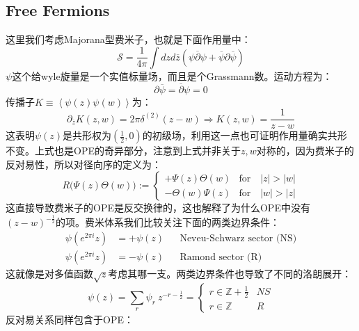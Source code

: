 \subsection{Free Fermions}
这里我们考虑Majorana型费米子，也就是下面作用量中：
\begin{equation}
	\mathcal{S}=\frac1{4\pi}\int dzd\overline{z}\left(\psi\overline{\partial}\psi+\overline{\psi}\partial\overline{\psi}\right)
\end{equation}
$\psi$这个给wyle旋量是一个实值标量场，而且是个Grassmann数。运动方程为：
\begin{equation}
	\partial\overline{\psi}=\overline{\partial}\psi=0
\end{equation}
传播子$K\equiv\left\langle\psi(z)\psi(w)\right\rangle$为：
\begin{equation}
	\partial_{\overline{z}}K(z,w)=2\pi\delta^{(2)}(z-w)\Rightarrow K(z,w)=\frac{1}{z-w}
\end{equation}
这表明$\psi(z)$是共形权为$(\frac{1}{2},0)$的初级场，利用这一点也可证明作用量确实共形不变。上式也是OPE的奇异部分，注意到上式并非关于$z,w$对称的，因为费米子的反对易性，所以对径向序的定义为：
\begin{equation}
	R\big(\Psi(z)\Theta(w)\big):=
	\begin{cases}+\Psi(z)\Theta(w)&\mathrm{for}\quad|z|>|w|\\-\Theta(w)\Psi(z)&\mathrm{for}\quad|w|>|z|\end{cases}
\end{equation}
这直接导致费米子的OPE是反交换律的，这也解释了为什么OPE中没有$(z-w)^{-\frac{1}{2}}$的项。费米体系我们比较关注下面的两类边界条件：
\begin{equation}
	\begin{aligned}\psi(e^{2\pi i}z)&=+\psi(z)&&\text{Neveu-Schwarz sector (NS)}\\\psi(e^{2\pi i}z)&=-\psi(z)&&\text{Ramond sector (R)}\end{aligned}
\end{equation}
这就像是对多值函数$\sqrt{z}$考虑其哪一支。两类边界条件也导致了不同的洛朗展开：
\begin{equation}
	\psi(z)=\sum_r\psi_r\mathrm{~}z^{-r-\frac12}=\begin{cases}r\in\mathbb{Z}+\frac1{2}&NS\\r\in\mathbb{Z}&R\end{cases}
\end{equation}
反对易关系同样包含于OPE：

